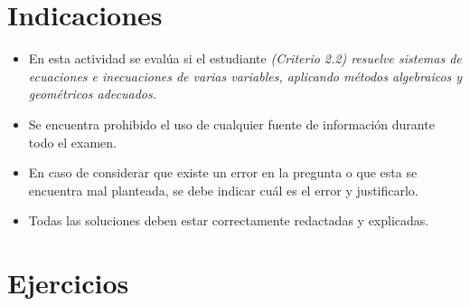 \documentclass[11pt,respuestas,a4]{aleph-examen}
\begin{document}
\encabezado

\section*{Indicaciones}
\begin{itemize}[leftmargin=*]
\item 
    En esta actividad se evalúa si el estudiante \textit{(Criterio 2.2) resuelve sistemas de ecuaciones e inecuaciones de varias variables,
    	aplicando métodos algebraicos y geométricos adecuados.} 
\item
    Se encuentra prohibido el uso de cualquier fuente de información durante todo el examen.
\item
    En caso de considerar que existe un error en la pregunta o que esta se encuentra mal planteada, se debe indicar cuál es el error y justificarlo.
\item
    Todas las soluciones deben estar correctamente redactadas y explicadas.
\end{itemize}

\section*{Ejercicios}
\end{document}
